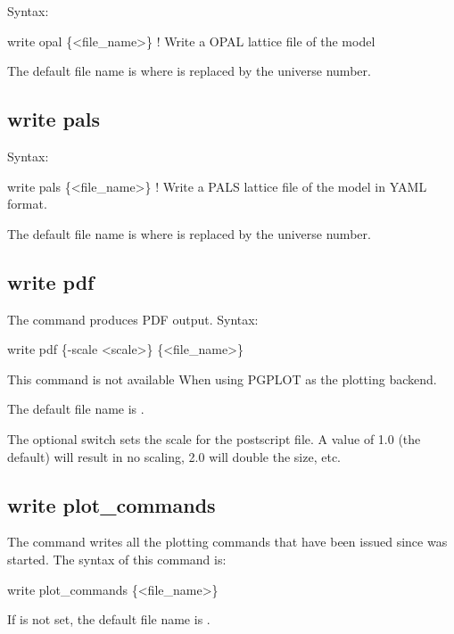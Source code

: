 {{{{{{{{{{{{Syntax:
\begin{example}
    write opal \{<file_name>\}  ! Write a OPAL lattice file of the model
\end{example}

The default file name is  where \vn{\#} is replaced by the universe number. 


\subsection{write pals}
\label{s:write.pals}

Syntax:
\begin{example}
    write pals \{<file_name>\}  ! Write a PALS lattice file of the model in YAML format.
\end{example}

The default file name is  where \vn{\#} is replaced by the universe number. 


\subsection{write pdf}
\label{s:write.pdf}

The  command produces PDF output. Syntax:
\begin{example}
  write pdf \{-scale <scale>\} \{<file_name>\}
\end{example}
This command is not available When using PGPLOT as the plotting backend.

The default file name is . 

The optional  switch sets the scale for the postscript file. A value of 1.0 (the
default) will result in no scaling, 2.0 will double the size, etc.


\subsection{write plot_commands}
\label{s:write.plot.cmds}

The  command writes all the plotting commands that have been issued since
\tao was started. The syntax of this command is:
\begin{example}
  write plot_commands \{<file_name>\}
\end{example}
If  is not set, the default file name is .

}}}}}}}}}}}}
